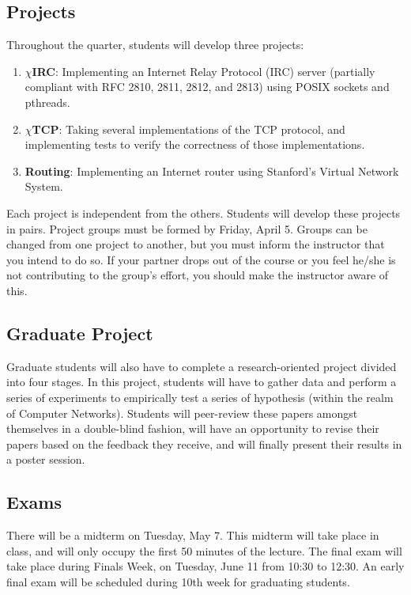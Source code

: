 \documentclass[11pt]{article}
\newcommand{\chirc}{$\chi$\textsf{IRC}}
\newcommand{\chitcp}{$\chi$\textsf{TCP}}
\begin{document}
\subsection{Projects}

Throughout the quarter, students will develop three projects:

\begin{enumerate}
 \item \textbf{\chirc}: Implementing an Internet Relay Protocol (IRC) server (partially compliant with RFC 2810, 2811, 2812, and 2813) using POSIX sockets and pthreads.
 \item \textbf{\chitcp}: Taking several implementations of the TCP protocol, and implementing tests to verify the correctness of those implementations.
 \item \textbf{Routing}: Implementing an Internet router using Stanford's Virtual Network System.
\end{enumerate}

Each project is independent from the others. Students will develop these projects in pairs. Project groups must be formed by Friday, April 5. Groups can be changed from one project to another, but you must inform the instructor that you intend to do so. If your partner drops out of the course or you feel he/she is not contributing to the group's effort, you should make the instructor aware of this.

\subsection{Graduate Project}

Graduate students will also have to complete a research-oriented project divided into four stages. In this project, students will have to gather data and perform a series of experiments to empirically test a series of hypothesis (within the realm of Computer Networks). Students will peer-review these papers amongst themselves in a double-blind fashion, will have an opportunity to revise their papers based on the feedback they receive, and will finally present their results in a poster session.

\subsection{Exams}

There will be a midterm on Tuesday, May 7. This midterm will take place in class, and will only occupy the first 50 minutes of the lecture. The final exam will take place during Finals Week, on Tuesday, June 11 from 10:30 to 12:30. An early final exam will be scheduled during 10th week for graduating students.
\end{document}
